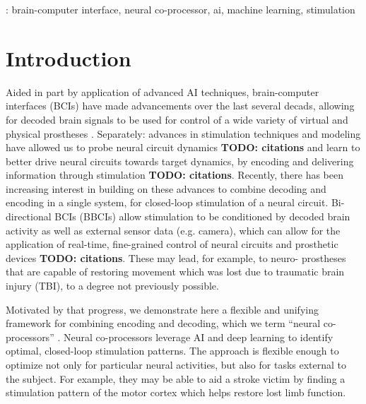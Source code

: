 \documentclass[12pt]{iopart}
\begin{document}
\vspace{2pc}
: brain-computer interface, neural co-processor, ai, machine learning, stimulation
%
%
\maketitle
% 
%



\section{Introduction}
Aided in part by application of advanced AI techniques, brain-computer interfaces (BCIs) have made
advancements over the last several decads, allowing for decoded brain signals to be used for
control of a wide variety of virtual and physical prostheses \cite{rao.bcibook} \cite{wolpaw.bcibook} \cite{moritz.neuro}
\cite{lebedev.bmi}. Separately: advances in stimulation techniques and modeling have allowed us to probe
neural circuit dynamics \textbf{TODO: citations} and learn to better drive neural circuits towards target
dynamics, by encoding and delivering information through stimulation \textbf{TODO: citations}.
Recently, there has been increasing interest in building on these advances to combine decoding
and encoding in a single system, for closed-loop stimulation of a neural circuit. Bi-directional
BCIs (BBCIs) allow stimulation to be conditioned by decoded brain activity as well as external
sensor data (e.g. camera), which can allow for the application of real-time, fine-grained control of
neural circuits and prosthetic devices \textbf{TODO: citations}. These may lead, for example, to neuro-
prostheses that are capable of restoring movement which was lost due to traumatic brain injury (TBI),
to a degree not previously possible.

Motivated by that progress, we demonstrate here a flexible and unifying framework for combining encoding
and decoding, which we term ``neural co-processors'' \cite{rao.coproc}. Neural co-processors leverage
AI and deep learning to identify optimal, closed-loop stimulation patterns. The approach is flexible
enough to optimize not only for particular neural activities, but also for tasks external to the
subject. For example, they may be able to aid a stroke victim by finding a stimulation pattern of
the motor cortex which helps restore lost limb function.
\end{document}

